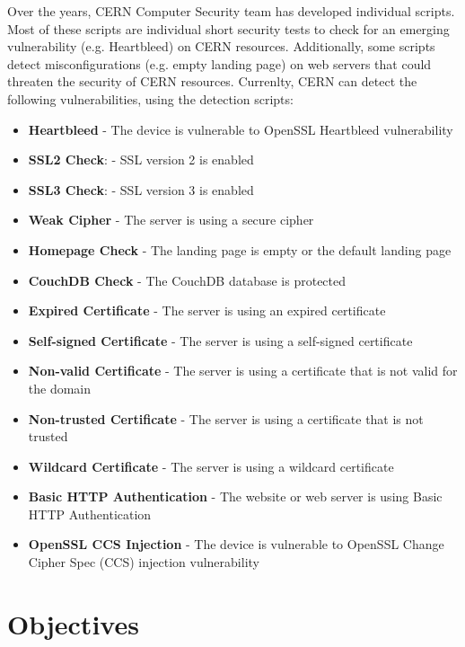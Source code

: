 Over the years, CERN Computer Security team has developed individual scripts. Most of these scripts are individual short security tests to check for an emerging vulnerability (e.g. Heartbleed) on CERN resources. Additionally, some scripts detect misconfigurations (e.g. empty landing page) on web servers that could threaten the security of CERN resources. Currenlty, CERN can detect the following vulnerabilities, using the detection scripts:
\begin{itemize}
\item \textbf{Heartbleed} - The device is vulnerable to OpenSSL Heartbleed vulnerability
\item \textbf{SSL2 Check}: - SSL version 2 is enabled
\item \textbf{SSL3 Check}: - SSL version 3 is enabled
\item \textbf{Weak Cipher} - The server is using a secure cipher
\item \textbf{Homepage Check} - The landing page is empty or the default landing page
\item \textbf{CouchDB Check} - The CouchDB database is protected
\item \textbf{Expired Certificate} - The server is using an expired certificate
\item \textbf{Self-signed Certificate} - The server is using a self-signed certificate
\item \textbf{Non-valid Certificate} - The server is using a certificate that is not valid for the domain
\item \textbf{Non-trusted Certificate} - The server is using a certificate that is not trusted
\item \textbf{Wildcard Certificate} - The server is using a wildcard certificate
\item \textbf{Basic HTTP Authentication} - The website or web server is using Basic HTTP Authentication
\item \textbf{OpenSSL CCS Injection} - The device is vulnerable to OpenSSL Change Cipher Spec (CCS) injection vulnerability

\end{itemize}



\section{Objectives}

